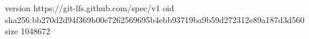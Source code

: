 version https://git-lfs.github.com/spec/v1
oid sha256:bb270d2d94f369b00e7262569695b4ebb93719ba9b59d272312e89a187d3d560
size 1048672
